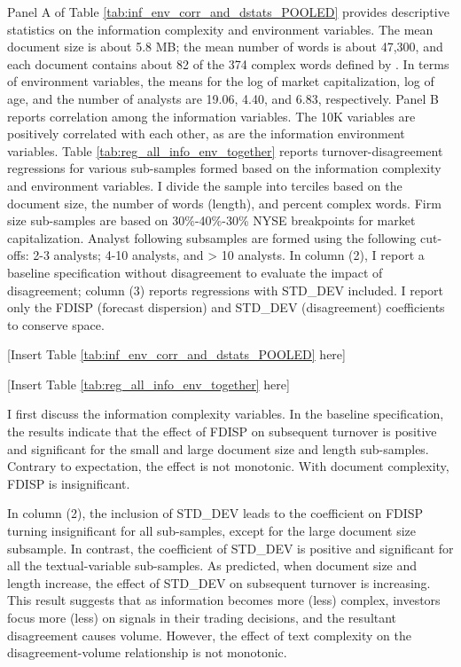 \documentclass[
  12pt,
  a4paper,
  twoside,
  onecolumn]{article}
\begin{document}
Panel A of Table \ref{tab:inf_env_corr_and_dstats_POOLED} provides
descriptive statistics on the information complexity and environment
variables. The mean document size is about 5.8 MB; the mean number of
words is about 47,300, and each document contains about 82 of the 374
complex words defined by \cite{lm_2020_firm_complexity}. In terms of
environment variables, the means for the log of market capitalization,
log of age, and the number of analysts are 19.06, 4.40, and 6.83,
respectively. Panel B reports correlation among the information
variables. The 10K variables are positively correlated with each other,
as are the information environment variables. Table
\ref{tab:reg_all_info_env_together} reports turnover-disagreement
regressions for various sub-samples formed based on the information
complexity and environment variables. I divide the sample into terciles
based on the document size, the number of words (length), and percent
complex words. Firm size sub-samples are based on 30\%-40\%-30\% NYSE
breakpoints for market capitalization. Analyst following subsamples are
formed using the following cut-offs: 2-3 analysts; 4-10 analysts, and
\textgreater{} 10 analysts. In column (2), I report a baseline
specification without disagreement to evaluate the impact of
disagreement; column (3) reports regressions with STD\_DEV included. I
report only the FDISP (forecast dispersion) and STD\_DEV (disagreement)
coefficients to conserve space.

\begin{center} { [Insert Table \ref{tab:inf_env_corr_and_dstats_POOLED} here] } \end{center}

\begin{center} { [Insert Table \ref{tab:reg_all_info_env_together} here] } \end{center}

I first discuss the information complexity variables. In the baseline
specification, the results indicate that the effect of FDISP on
subsequent turnover is positive and significant for the small and large
document size and length sub-samples. Contrary to expectation, the
effect is not monotonic. With document complexity, FDISP is
insignificant.

In column (2), the inclusion of STD\_DEV leads to the coefficient on
FDISP turning insignificant for all sub-samples, except for the large
document size subsample. In contrast, the coefficient of STD\_DEV is
positive and significant for all the textual-variable sub-samples. As
predicted, when document size and length increase, the effect of
STD\_DEV on subsequent turnover is increasing. This result suggests that
as information becomes more (less) complex, investors focus more (less)
on signals in their trading decisions, and the resultant disagreement
causes volume. However, the effect of text complexity on the
disagreement-volume relationship is not monotonic.
\end{document}
